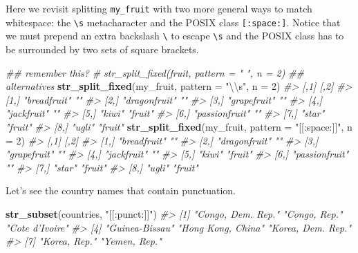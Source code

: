 \documentclass[
]{book}
\newenvironment{Shaded}{\begin{snugshade}}{\end{snugshade}}
\newcommand{\CharTok}[1]{\textcolor[rgb]{0.31,0.60,0.02}{#1}}
\newcommand{\CommentTok}[1]{\textcolor[rgb]{0.56,0.35,0.01}{\textit{#1}}}
\newcommand{\DataTypeTok}[1]{\textcolor[rgb]{0.13,0.29,0.53}{#1}}
\newcommand{\DecValTok}[1]{\textcolor[rgb]{0.00,0.00,0.81}{#1}}
\newcommand{\KeywordTok}[1]{\textcolor[rgb]{0.13,0.29,0.53}{\textbf{#1}}}
\newcommand{\NormalTok}[1]{#1}
\newcommand{\StringTok}[1]{\textcolor[rgb]{0.31,0.60,0.02}{#1}}
\begin{document}
Here we revisit splitting \texttt{my\_fruit} with two more general ways to match whitespace: the \texttt{\textbackslash{}s} metacharacter and the POSIX class \texttt{{[}:space:{]}}. Notice that we must prepend an extra backslash \texttt{\textbackslash{}} to escape \texttt{\textbackslash{}s} and the POSIX class has to be surrounded by two sets of square brackets.

\begin{Shaded}
\begin{Highlighting}[]
\CommentTok{## remember this?}
\CommentTok{# str_split_fixed(fruit, pattern = " ", n = 2)}
\CommentTok{## alternatives}
\KeywordTok{str_split_fixed}\NormalTok{(my_fruit, }\DataTypeTok{pattern =} \StringTok{"}\CharTok{\textbackslash{}\textbackslash{}}\StringTok{s"}\NormalTok{, }\DataTypeTok{n =} \DecValTok{2}\NormalTok{)}
\CommentTok{#>      [,1]           [,2]   }
\CommentTok{#> [1,] "breadfruit"   ""     }
\CommentTok{#> [2,] "dragonfruit"  ""     }
\CommentTok{#> [3,] "grapefruit"   ""     }
\CommentTok{#> [4,] "jackfruit"    ""     }
\CommentTok{#> [5,] "kiwi"         "fruit"}
\CommentTok{#> [6,] "passionfruit" ""     }
\CommentTok{#> [7,] "star"         "fruit"}
\CommentTok{#> [8,] "ugli"         "fruit"}
\KeywordTok{str_split_fixed}\NormalTok{(my_fruit, }\DataTypeTok{pattern =} \StringTok{"[[:space:]]"}\NormalTok{, }\DataTypeTok{n =} \DecValTok{2}\NormalTok{)}
\CommentTok{#>      [,1]           [,2]   }
\CommentTok{#> [1,] "breadfruit"   ""     }
\CommentTok{#> [2,] "dragonfruit"  ""     }
\CommentTok{#> [3,] "grapefruit"   ""     }
\CommentTok{#> [4,] "jackfruit"    ""     }
\CommentTok{#> [5,] "kiwi"         "fruit"}
\CommentTok{#> [6,] "passionfruit" ""     }
\CommentTok{#> [7,] "star"         "fruit"}
\CommentTok{#> [8,] "ugli"         "fruit"}
\end{Highlighting}
\end{Shaded}

Let's see the country names that contain punctuation.

\begin{Shaded}
\begin{Highlighting}[]
\KeywordTok{str_subset}\NormalTok{(countries, }\StringTok{"[[:punct:]]"}\NormalTok{)}
\CommentTok{#> [1] "Congo, Dem. Rep." "Congo, Rep."      "Cote d'Ivoire"   }
\CommentTok{#> [4] "Guinea-Bissau"    "Hong Kong, China" "Korea, Dem. Rep."}
\CommentTok{#> [7] "Korea, Rep."      "Yemen, Rep."}
\end{Highlighting}
\end{Shaded}
\end{document}
